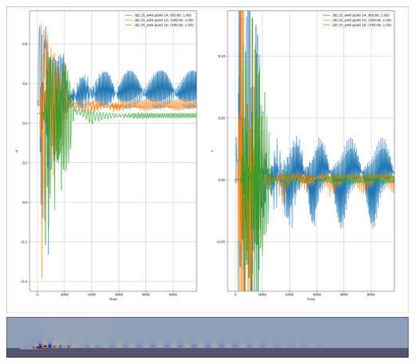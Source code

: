 \documentclass[
  aspectratio=169, %
  t, %
  onlytextwidth, %
  10pt, %
]{beamer}
\begin{document}
\begin{frame}
\begin{columns}[T]
\begin{column}{0.45\linewidth}
			\includegraphics[width=\textwidth]{Images/d2.25_w40.png}
			\includegraphics[width=\textwidth]{Images/d2.25_w40_dom.png}
		\end{column}
	\end{columns}
\end{frame}
\end{document}
